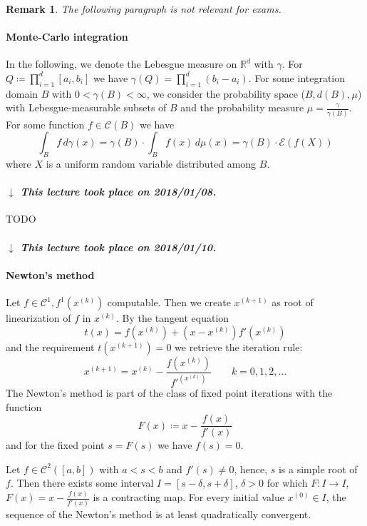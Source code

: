 \documentclass[a4paper]{article}
\numberwithin{lecref}{section}
\theoremstyle{break}
\newtheorem*{Remark}{Remark}
\newcommand{\dateref}[1]{%
  \begin{mdframed}[backgroundcolor=gray!10,innerbottommargin=0pt,innertopmargin=0pt]
    \paragraph{\textit{$\downarrow$ This lecture took place on #1.}}%
  \end{mdframed}%
}
\begin{document}
\begin{Remark}
  The following paragraph is not relevant for exams.
\end{Remark}

\paragraph{Monte-Carlo integration}

In the following, we denote the Lebesgue measure on $\mathbb R^d$ with $\gamma$.
For $Q \coloneqq \prod_{i=1}^d [a_i, b_i]$ we have $\gamma(Q) = \prod_{i=1}^{d} (b_i - a_i)$.
For some integration domain $B$ with $0 < \gamma(B) < \infty$, we consider the probability space ($B, d(B), \mu$) with Lebesgue-measurable subsets of $B$ and the probability measure $\mu = \frac{\gamma}{\gamma(B)}$. For some function $f \in \mathcal C(B)$ we have
\[ \int_B f \, d\gamma(x) = \gamma(B) \cdot \int_B f(x) \, d\mu(x) = \gamma(B) \cdot \mathcal E(f(X)) \]
where $X$ is a uniform random variable distributed among $B$.

\dateref{2018/01/08}

TODO

\dateref{2018/01/10}

\paragraph{Newton's method}

Let $f \in \mathcal C^1, f^1(x^{(k)})$ computable. Then we create $x^{(k+1)}$ as root of linearization of $f$ in $x^{(k)}$. By the tangent equation
\[ t(x) = f(x^{(k)}) + (x - x^{(k)})f'(x^{(k)}) \]
and the requirement $t(x^{(k+1)}) = 0$ we retrieve the iteration rule:
\[ x^{(k+1)} = x^{(k)} - \frac{f(x^{(k)})}{f'^(x^{(k)})} \qquad k = 0, 1, 2, \dots \]
The Newton's method is part of the class of fixed point iterations with the function
\[ F(x) \coloneqq x - \frac{f(x)}{f'(x)} \]
and for the fixed point $s = F(s)$ we have $f(s) = 0$.

\begin{theorem}
  \label{theorem:6-2}
  Let $f \in \mathcal C^2([a, b])$ with $a < s < b$ and $f'(s) \neq 0$, hence, $s$ is a simple root of $f$.
  Then there exists some interval $I = [s - \delta, s + \delta]$, $\delta > 0$ for which $F: I \to I$, $F(x) = x - \frac{f(x)}{f'(x)}$ is a contracting map. For every initial value $x^{(0)} \in I$, the sequence of the Newton's method is at least quadratically convergent.
\end{theorem}
\end{document}
